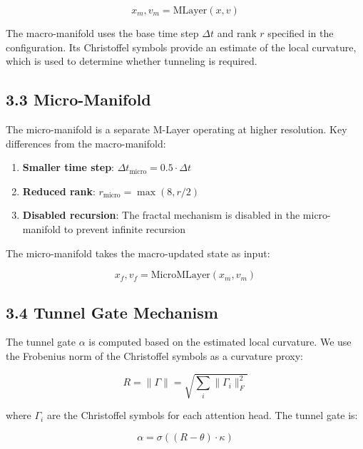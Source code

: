 \documentclass[12pt]{article}
\begin{document}
\begin{equation}
x_m, v_m = \text{MLayer}(x, v)
\end{equation}

The macro-manifold uses the base time step $\Delta t$ and rank $r$ specified in the configuration. Its Christoffel symbols provide an estimate of the local curvature, which is used to determine whether tunneling is required.

\subsection{3.3 Micro-Manifold}

The micro-manifold is a separate M-Layer operating at higher resolution. Key differences from the macro-manifold:

\begin{enumerate}
\item \textbf{Smaller time step}: $\Delta t_\text{micro} = 0.5 \cdot \Delta t$
\item \textbf{Reduced rank}: $r_\text{micro} = \max(8, r/2)$
\item \textbf{Disabled recursion}: The fractal mechanism is disabled in the micro-manifold to prevent infinite recursion
\end{enumerate}

The micro-manifold takes the macro-updated state as input:

\begin{equation}
x_f, v_f = \text{MicroMLayer}(x_m, v_m)
\end{equation}

\subsection{3.4 Tunnel Gate Mechanism}

The tunnel gate $\alpha$ is computed based on the estimated local curvature. We use the Frobenius norm of the Christoffel symbols as a curvature proxy:

\begin{equation}
R = \|\Gamma\| = \sqrt{\sum_i \|\Gamma_i\|_F^2}
\end{equation}

where $\Gamma_i$ are the Christoffel symbols for each attention head. The tunnel gate is:

\begin{equation}
\alpha = \sigma((R - \theta) \cdot \kappa)
\end{equation}
\end{document}
